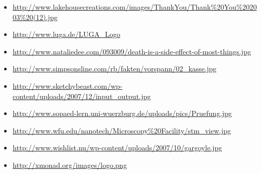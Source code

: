 \documentclass[12pt,compress,ngerman]{beamer}
\begin{document}
{\begin{itemize}
    \item \url{http://www.lakehousecreations.com/images/ThankYou/Thank\%20You\%202003\%20(12).jpg}
    \item \url{http://www.luga.de/LUGA_Logo}
    \item \url{http://www.nataliedee.com/093009/death-is-a-side-effect-of-most-things.jpg}
    \item \url{http://www.simpsonsline.com/rb/fakten/vorspann/02_kasse.jpg}
    \item \url{http://www.sketchybeast.com/wp-content/uploads/2007/12/input_output.jpg}
    \item \url{http://www.sopaed-lern.uni-wuerzburg.de/uploads/pics/Pruefung.jpg}
    \item \url{http://www.wfu.edu/nanotech/Microscopy\%20Facility/stm_view.jpg}
    \item \url{http://www.wishlist.nu/wp-content/uploads/2007/10/gargoyle.jpg}
    \item \url{http://xmonad.org/images/logo.png}
  \end{itemize}
}
\end{document}
